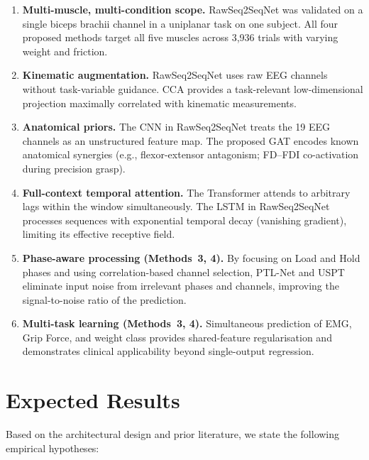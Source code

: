 \documentclass[12pt, a4paper]{article}
\begin{document}
	\begin{enumerate}[leftmargin=*, itemsep=4pt]
		\item \textbf{Multi-muscle, multi-condition scope.} RawSeq2SeqNet was
		validated on a single biceps brachii channel in a uniplanar task on one
		subject. All four proposed methods target all five muscles across 3,936
		trials with varying weight and friction.
		
		\item \textbf{Kinematic augmentation.} RawSeq2SeqNet uses raw EEG channels
		without task-variable guidance. CCA provides a task-relevant low-dimensional
		projection maximally correlated with kinematic measurements.
		
		\item \textbf{Anatomical priors.} The CNN in RawSeq2SeqNet treats the 19
		EEG channels as an unstructured feature map. The proposed GAT encodes
		known anatomical synergies (e.g., flexor-extensor antagonism; FD--FDI
		co-activation during precision grasp).
		
		\item \textbf{Full-context temporal attention.} The Transformer attends to
		arbitrary lags within the window simultaneously. The LSTM in RawSeq2SeqNet
		processes sequences with exponential temporal decay (vanishing gradient),
		limiting its effective receptive field.
		
		\item \textbf{Phase-aware processing (Methods~3, 4).} By focusing on
		Load and Hold phases and using correlation-based channel selection,
		PTL-Net and USPT eliminate input noise from irrelevant phases and
		channels, improving the signal-to-noise ratio of the prediction.
		
		\item \textbf{Multi-task learning (Methods~3, 4).} Simultaneous prediction
		of EMG, Grip Force, and weight class provides shared-feature regularisation
		and demonstrates clinical applicability beyond single-output regression.
	\end{enumerate}
	
	\section{Expected Results}
	
	Based on the architectural design and prior literature, we state the following
	empirical hypotheses:
	
\end{document}
